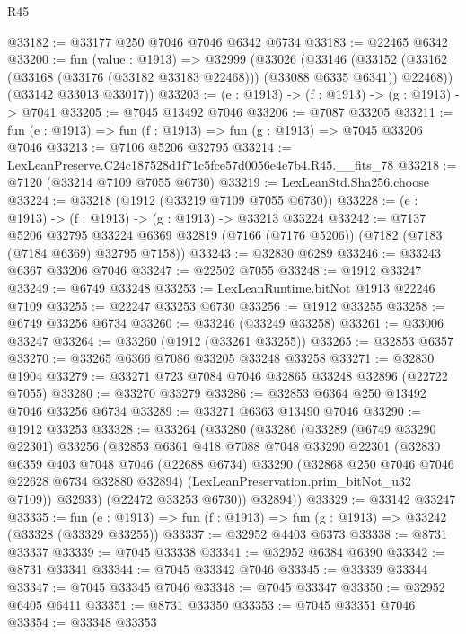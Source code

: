 \begin{lexlean}{R45}
\begin{coremodule}
{@33182 := @33177 @250 @7046 @7046 @6342 @6734
@33183 := @22465 @6342
@33200 := fun (value : @1913) =>
  @32999
    (@33026
      (@33146
        (@33152 (@33162 (@33168 (@33176 (@33182 @33183 @22468))) (@33088 @6335 @6341)) @22468))
      (@33142 @33013 @33017))
@33203 := (e : @1913) -> (f : @1913) -> (g : @1913) -> @7041
@33205 := @7045 @13492 @7046
@33206 := @7087 @33205
@33211 := fun (e : @1913) => fun (f : @1913) => fun (g : @1913) => @7045 @33206 @7046
@33213 := @7106 @5206 @32795
@33214 := LexLeanPreserve.C24c187528d1f71c5fce57d0056e4e7b4.R45.__fits_78
@33218 := @7120 (@33214 @7109 @7055 @6730)
@33219 := LexLeanStd.Sha256.choose
@33224 := @33218 (@1912 (@33219 @7109 @7055 @6730))
@33228 := (e : @1913) -> (f : @1913) -> (g : @1913) -> @33213 @33224
@33242 := @7137
    @5206
    @32795
    @33224
    @6369
    @32819
    (@7166 (@7176 @5206))
    (@7182 (@7183 (@7184 @6369) @32795 @7158))
@33243 := @32830 @6289
@33246 := @33243 @6367 @33206 @7046
@33247 := @22502 @7055
@33248 := @1912 @33247
@33249 := @6749 @33248
@33253 := LexLeanRuntime.bitNot @1913 @22246 @7109
@33255 := @22247 @33253 @6730
@33256 := @1912 @33255
@33258 := @6749 @33256 @6734
@33260 := @33246 (@33249 @33258)
@33261 := @33006 @33247
@33264 := @33260 (@1912 (@33261 @33255))
@33265 := @32853 @6357
@33270 := @33265 @6366 @7086 @33205 @33248 @33258
@33271 := @32830 @1904
@33279 := @33271 @723 @7084 @7046 @32865 @33248 @32896 (@22722 @7055)
@33280 := @33270 @33279
@33286 := @32853 @6364 @250 @13492 @7046 @33256 @6734
@33289 := @33271 @6363 @13490 @7046
@33290 := @1912 @33253
@33328 := @33264
    (@33280
      (@33286
        (@33289
          (@6749 @33290 @22301)
          @33256
          (@32853
            @6361
            @418
            @7088
            @7048
            @33290
            @22301
            (@32830
              @6359
              @403
              @7048
              @7046
              (@22688 @6734)
              @33290
              (@32868 @250 @7046 @7046 @22628 @6734 @32880 @32894)
              (LexLeanPreservation.prim_bitNot_u32 @7109))
            @32933)
          (@22472 @33253 @6730))
        @32894))
@33329 := @33142 @33247
@33335 := fun (e : @1913) => fun (f : @1913) => fun (g : @1913) => @33242 (@33328 (@33329 @33255))
@33337 := @32952 @4403 @6373
@33338 := @8731 @33337
@33339 := @7045 @33338
@33341 := @32952 @6384 @6390
@33342 := @8731 @33341
@33344 := @7045 @33342 @7046
@33345 := @33339 @33344
@33347 := @7045 @33345 @7046
@33348 := @7045 @33347
@33350 := @32952 @6405 @6411
@33351 := @8731 @33350
@33353 := @7045 @33351 @7046
@33354 := @33348 @33353
}
\end{coremodule}
\end{lexlean}
